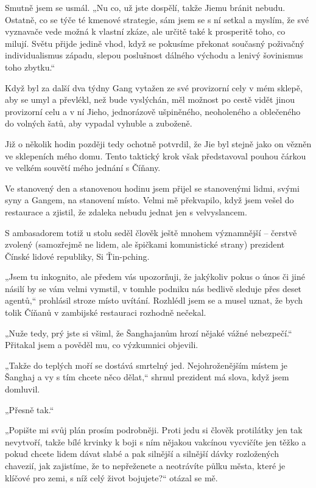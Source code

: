 Smutně jsem se usmál. „Nu co, už jste dospělí, takže Jiemu bránit nebudu. Ostatně, co se týče té kmenové strategie, sám jsem se s ní setkal a myslím, že své vyznavače vede možná k vlastní zkáze, ale určitě také k prosperitě toho, co milují. Světu přijde jedině vhod, když se pokusíme překonat současný poživačný individualismus západu, slepou poslušnost dálného východu a lenivý šovinismus toho zbytku.“

Když byl za další dva týdny Gang vytažen ze své provizorní cely v mém sklepě, aby se umyl a převlékl, než bude vyslýchán, měl možnost po cestě vidět jinou provizorní celu a v ní Jieho, jednorázově ušpiněného, neoholeného a oblečeného do volných šatů, aby vypadal vyhuble a zuboženě.

Již o několik hodin později tedy ochotně potvrdil, že Jie byl stejně jako on vězněn ve sklepeních mého domu. Tento taktický krok však představoval pouhou čárkou ve velkém souvětí mého jednání s Číňany.
\vspace{0.75cm}

Ve stanovený den a stanovenou hodinu jsem přijel se stanovenými lidmi, svými syny a Gangem, na stanovení místo. Velmi mě překvapilo, když jsem vešel do restaurace a zjistil, že zdaleka nebudu jednat jen s velvyslancem.

S ambasadorem totiž u stolu seděl člověk ještě mnohem významnější – čerstvě zvolený (samozřejmě ne lidem, ale špičkami komunistické strany) prezident Čínské lidové republiky, Si Ťin-pching. 

„Jsem tu inkognito, ale předem vás upozorňuji, že jakýkoliv pokus o únos či jiné násilí by se vám velmi vymstil, v tomhle podniku nás bedlivě sleduje přes deset agentů,“ prohlásil stroze místo uvítání. Rozhlédl jsem se a musel uznat, že bych tolik Číňanů v zambijské restauraci rozhodně nečekal.

„Nuže tedy, prý jste si všiml, že Šanghajanům hrozí nějaké vážné nebezpečí.“
Přitakal jsem a pověděl mu, co výzkumnici objevili.

 „Takže do teplých moří se dostává smrtelný jed. Nejohroženějším místem je Šanghaj a vy s tím chcete něco dělat,“ shrnul prezident má slova, když jsem domluvil.
 
„Přesně tak.“

„Popište mi svůj plán prosím podrobněji. Proti jedu si člověk protilátky jen tak nevytvoří, takže bílé krvinky k boji s ním nějakou vakcínou vycvičíte jen těžko a pokud chcete lidem dávat slabé a pak silnější a silnější dávky rozložených chavezií, jak zajistíme, že to nepřeženete a neotrávíte půlku města, které je klíčové pro zemi, s níž celý život bojujete?“ otázal se mě.

